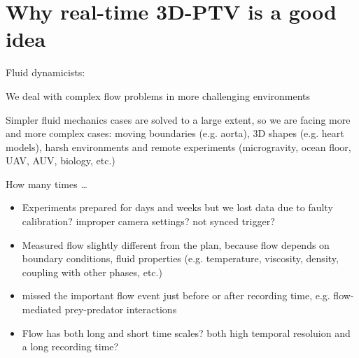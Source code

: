 
\section{Why real-time 3D-PTV is a good idea}

\begin{frame}[label=why-1]{Fluid dynamicists: }
    \centering{}
\end{frame}


\begin{frame}[label=why-3]{We deal with complex flow problems in more challenging environments}
\begin{card}
    Simpler fluid mechanics cases are solved to a large extent, so we are facing more and more complex cases: 
    moving boundaries (e.g. aorta), 3D shapes (e.g. heart models), harsh environments and remote experiments (microgravity, ocean floor, UAV, AUV, biology, etc.)
\end{card}
\end{frame}

\begin{frame}[label=why-3a]{How many times \ldots }
\begin{itemize}
    \item Experiments prepared for days and weeks but we lost data due to faulty calibration? improper camera settings? not synced trigger? 
    \item Measured flow slightly different from the plan, because flow depends on boundary conditions, fluid properties (e.g. temperature, viscosity, density, coupling with other phases, etc.)

    \item missed the important flow event just before or after recording time, e.g. flow-mediated prey-predator interactions
    \item Flow has both long and short time scales? both high temporal resoluion and a long recording time? 
\end{itemize}
\end{frame}


